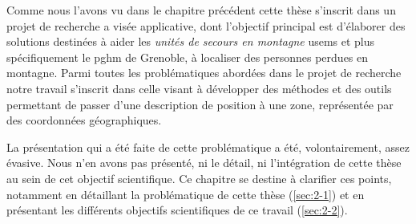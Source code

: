 Comme nous l'avons vu dans le chapitre précédent cette thèse s'inscrit
dans un projet de recherche a visée applicative, dont l'objectif
principal est d’élaborer des solutions destinées à aider les
\emph{unités de secours en montagne} \acp{usem} et plus spécifiquement
le \ac{pghm} de Grenoble, à localiser des personnes perdues en
montagne. Parmi toutes les problématiques abordées dans le projet de
recherche  notre travail s'inscrit dans celle visant à
développer des méthodes et des outils permettant de passer d'une
description de position à une zone, représentée par des coordonnées
géographiques.

La présentation qui a été faite de cette problématique a été,
volontairement, assez évasive. Nous n'en avons pas présenté, ni le
détail, ni l'intégration de cette thèse au sein de cet objectif
scientifique. Ce chapitre se destine à clarifier ces points, notamment
en détaillant la problématique de cette thèse (\autoref{sec:2-1}) et en
présentant les différents objectifs scientifiques de ce travail
(\autoref{sec:2-2}).


